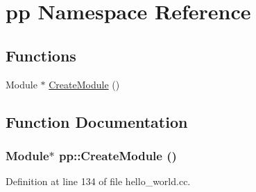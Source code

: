\hypertarget{namespacepp}{
\section{pp Namespace Reference}
\label{namespacepp}
}
\subsection*{Functions}
\begin{DoxyCompactItemize}
\item 
Module $\ast$ \hyperlink{namespacepp_a58f6f61fb443a35ebea1af55e1d5f825}{CreateModule} ()
\end{DoxyCompactItemize}


\subsection{Function Documentation}
\hypertarget{namespacepp_a58f6f61fb443a35ebea1af55e1d5f825}{
\subsubsection[{CreateModule}]{\setlength{\rightskip}{0pt plus 5cm}Module$\ast$ pp::CreateModule ()}}
\label{namespacepp_a58f6f61fb443a35ebea1af55e1d5f825}


Definition at line 134 of file hello\_\-world.cc.

